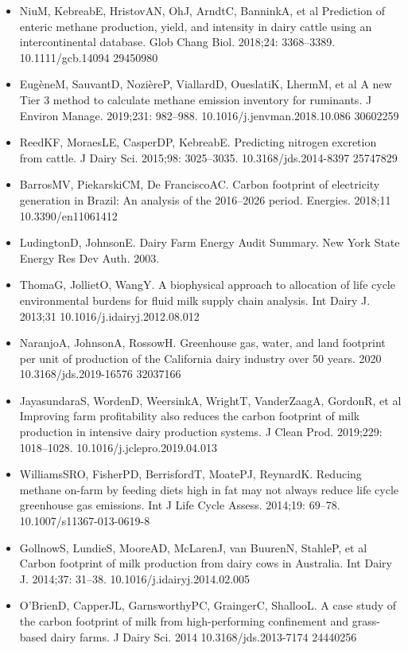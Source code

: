 \documentclass[11pt,a4paper]{article}
\begin{document}
\begin{itemize}
\item NiuM, KebreabE, HristovAN, OhJ, ArndtC, BanninkA, et al Prediction of enteric methane production, yield, and intensity in dairy cattle using an intercontinental database. Glob Chang Biol. 2018;24: 3368–3389. 10.1111/gcb.14094 29450980
\item EugèneM, SauvantD, NozièreP, ViallardD, OueslatiK, LhermM, et al A new Tier 3 method to calculate methane emission inventory for ruminants. J Environ Manage. 2019;231: 982–988. 10.1016/j.jenvman.2018.10.086 30602259
\item ReedKF, MoraesLE, CasperDP, KebreabE. Predicting nitrogen excretion from cattle. J Dairy Sci. 2015;98: 3025–3035. 10.3168/jds.2014-8397 25747829
\item BarrosMV, PiekarskiCM, De FranciscoAC. Carbon footprint of electricity generation in Brazil: An analysis of the 2016–2026 period. Energies. 2018;11 10.3390/en11061412
\item LudingtonD, JohnsonE. Dairy Farm Energy Audit Summary. New York State Energy Res Dev Auth. 2003.
\item ThomaG, JollietO, WangY. A biophysical approach to allocation of life cycle environmental burdens for fluid milk supply chain analysis. Int Dairy J. 2013;31 10.1016/j.idairyj.2012.08.012
\item NaranjoA, JohnsonA, RossowH. Greenhouse gas, water, and land footprint per unit of production of the California dairy industry over 50 years. 2020 10.3168/jds.2019-16576 32037166
\item JayasundaraS, WordenD, WeersinkA, WrightT, VanderZaagA, GordonR, et al Improving farm profitability also reduces the carbon footprint of milk production in intensive dairy production systems. J Clean Prod. 2019;229: 1018–1028. 10.1016/j.jclepro.2019.04.013
\item WilliamsSRO, FisherPD, BerrisfordT, MoatePJ, ReynardK. Reducing methane on-farm by feeding diets high in fat may not always reduce life cycle greenhouse gas emissions. Int J Life Cycle Assess. 2014;19: 69–78. 10.1007/s11367-013-0619-8
\item GollnowS, LundieS, MooreAD, McLarenJ, van BuurenN, StahleP, et al Carbon footprint of milk production from dairy cows in Australia. Int Dairy J. 2014;37: 31–38. 10.1016/j.idairyj.2014.02.005
\item O’BrienD, CapperJL, GarnsworthyPC, GraingerC, ShallooL. A case study of the carbon footprint of milk from high-performing confinement and grass-based dairy farms. J Dairy Sci. 2014 10.3168/jds.2013-7174 24440256

\end{itemize}
\end{document}
